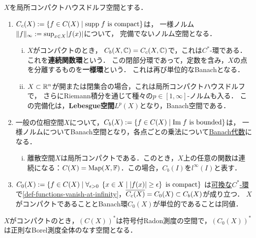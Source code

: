 \documentclass[uplatex,dvipdfmx]{jsreport}
\begin{document}
\begin{example}[位相空間上の体値関数]\label{exp-Banach-spaces}
    $X$を局所コンパクトハウスドルフ空間とする．
    \begin{enumerate}
        \item $C_c(X):=\left\{f\in C(X)\mid\mathrm{supp}\; f\text{ is compact}\right\}$は，
        一様ノルム$\|f\|_\infty:=\sup_{x\in X}\lvert f(x)\rvert$について，
        完備でないノルム空間となる．
        \begin{enumerate}[(i)]
            \item $X$がコンパクトのとき，
            $C_b(X,\mathbb{C})=C_c(X,\mathbb{C})$で，これは$C^*$-環である．
            これを\textbf{連続関数環}という．
            この閉部分環であって，定数を含み，$X$の点を分離するものを\textbf{一様環}という．
            これは再び単位的なBanachとなる．
            \item $X\subset\mathbb{R}^n$が開または閉集合の場合，これは局所コンパクトハウスドルフで，
            さらにRiemann積分を通じて種々の$p\in[1,\infty]$-ノルムも入る．
            この完備化は，\textbf{Lebesgue空間}$L^p(X)$となり，Banach空間である．
        \end{enumerate}
        \item 一般の位相空間$X$について，$C_b(X):=\left\{f\in C(X)\mid\mathrm{Im}\; f\text{ is bounded}\right\}$は，
        一様ノルムについてBanach空間となり，各点ごとの乗法について\underline{Banach代数}になる．
        \begin{enumerate}[(i)]
            \item 離散空間$X$は局所コンパクトである．このとき，$X$上の任意の関数は連続になる：$C(X)=\mathrm{Map}(X,\mathbb{F})$．この場合，$C_b(I)$を$l^\infty(I)$と表す．
        \end{enumerate}
        \item 
        $C_0(X):=\left\{f\in C(X)\mid\forall_{\epsilon>0}\;\left\{x\in X\mid\lvert f(x)\rvert\ge\epsilon\right\}\text{ is compact}\right\}$
        は\underline{可換な$C^*$-環}で\ref{def-functions-vanish-at-infinity}，$\overline{C_c(X)}=C_0(X)\subset C_b(X)$が成り立つ．
            $X$がコンパクトであることとBanach環$C_0(X)$が単位的であることは同値．
    \end{enumerate}
    $X$がコンパクトのとき，$(C(X))^*$は符号付Radon測度の空間で，$(C_0(X))^*$は正則なBorel測度全体のなす空間となる．
\end{example}
\end{document}
